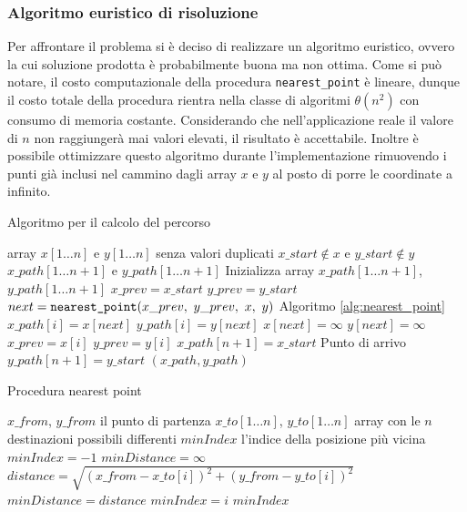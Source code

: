 \subsubsection{Algoritmo euristico di risoluzione}
Per affrontare il problema si è deciso di realizzare un algoritmo euristico, ovvero la cui soluzione prodotta è probabilmente buona ma non ottima.
Come si può notare, il costo computazionale della procedura \verb|nearest_point| è lineare, dunque il costo totale della procedura rientra nella classe di algoritmi $\theta(n^2)$ con consumo di memoria costante. Considerando che nell'applicazione reale il valore di $n$ non raggiungerà mai valori elevati, il risultato è accettabile. Inoltre è possibile ottimizzare questo algoritmo durante l'implementazione rimuovendo i punti già inclusi nel cammino dagli array $x$ e $y$ al posto di porre le coordinate a infinito.

\begin{algorithm}
    \caption{Algoritmo per il calcolo del percorso}
    \label{alg:calculate_track}
    \begin{algorithmic}
        \Require array $x[1 \dotso n]$ e $y[1 \dotso n]$ senza valori duplicati
        \Require $x\_start \notin x$ e $y\_start \notin y$
        \Ensure $x\_path[1 \dotso n+1]$ e $y\_path[1 \dotso n+1]$
        \State Inizializza array $x\_path[1 \dotso n+1]$, $y\_path[1 \dotso n+1]$
        \State $x\_prev = x\_start$
        \State $y\_prev = y\_start$
            \State $next = \verb|nearest_point|(x\_prev,\  y\_prev,\  x,\  y)$
            \Comment Algoritmo \ref{alg:nearest_point}
            \State $x\_path[i] = x[next]$
            \State $y\_path[i] = y[next]$
            \State $x[next] = \infty$
            \State $y[next] = \infty$
            \State $x\_prev = x[i]$
            \State $y\_prev = y[i]$
        \EndFor
        \State $x\_path[n+1] = x\_start$ \Comment Punto di arrivo
        \State $y\_path[n+1] = y\_start$
        \State \Return $(x\_path , y\_path)$
    \end{algorithmic}
\end{algorithm}

\begin{algorithm}
    \caption{Procedura nearest point}
    \label{alg:nearest_point}
    \begin{algorithmic}
        \Require $x\_from$, $y\_from$ il punto di partenza
        \Require $x\_to[1 \dotso n]$, $y\_to[1 \dotso n]$ array con le $n$ destinazioni possibili differenti
        \Ensure $minIndex$ l'indice della posizione più vicina
        \State $minIndex = -1$
        \State $minDistance = \infty$
            \State $distance = \sqrt{(x\_from - x\_to[i])^2 + (y\_from - y\_to[i])^2}$
                \State $minDistance = distance$
                \State $minIndex = i$
            \EndIf
        \EndFor
        \State \Return $minIndex$
    \end{algorithmic}
\end{algorithm}

